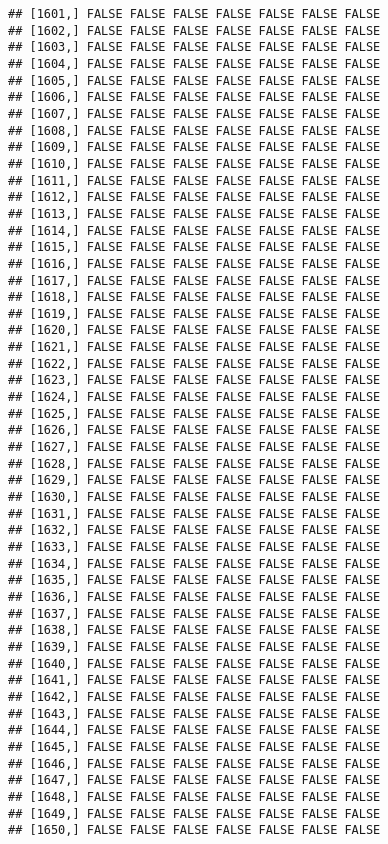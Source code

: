 \documentclass[
]{article}
\begin{document}
\begin{verbatim}
## [1601,] FALSE FALSE FALSE FALSE FALSE FALSE FALSE
## [1602,] FALSE FALSE FALSE FALSE FALSE FALSE FALSE
## [1603,] FALSE FALSE FALSE FALSE FALSE FALSE FALSE
## [1604,] FALSE FALSE FALSE FALSE FALSE FALSE FALSE
## [1605,] FALSE FALSE FALSE FALSE FALSE FALSE FALSE
## [1606,] FALSE FALSE FALSE FALSE FALSE FALSE FALSE
## [1607,] FALSE FALSE FALSE FALSE FALSE FALSE FALSE
## [1608,] FALSE FALSE FALSE FALSE FALSE FALSE FALSE
## [1609,] FALSE FALSE FALSE FALSE FALSE FALSE FALSE
## [1610,] FALSE FALSE FALSE FALSE FALSE FALSE FALSE
## [1611,] FALSE FALSE FALSE FALSE FALSE FALSE FALSE
## [1612,] FALSE FALSE FALSE FALSE FALSE FALSE FALSE
## [1613,] FALSE FALSE FALSE FALSE FALSE FALSE FALSE
## [1614,] FALSE FALSE FALSE FALSE FALSE FALSE FALSE
## [1615,] FALSE FALSE FALSE FALSE FALSE FALSE FALSE
## [1616,] FALSE FALSE FALSE FALSE FALSE FALSE FALSE
## [1617,] FALSE FALSE FALSE FALSE FALSE FALSE FALSE
## [1618,] FALSE FALSE FALSE FALSE FALSE FALSE FALSE
## [1619,] FALSE FALSE FALSE FALSE FALSE FALSE FALSE
## [1620,] FALSE FALSE FALSE FALSE FALSE FALSE FALSE
## [1621,] FALSE FALSE FALSE FALSE FALSE FALSE FALSE
## [1622,] FALSE FALSE FALSE FALSE FALSE FALSE FALSE
## [1623,] FALSE FALSE FALSE FALSE FALSE FALSE FALSE
## [1624,] FALSE FALSE FALSE FALSE FALSE FALSE FALSE
## [1625,] FALSE FALSE FALSE FALSE FALSE FALSE FALSE
## [1626,] FALSE FALSE FALSE FALSE FALSE FALSE FALSE
## [1627,] FALSE FALSE FALSE FALSE FALSE FALSE FALSE
## [1628,] FALSE FALSE FALSE FALSE FALSE FALSE FALSE
## [1629,] FALSE FALSE FALSE FALSE FALSE FALSE FALSE
## [1630,] FALSE FALSE FALSE FALSE FALSE FALSE FALSE
## [1631,] FALSE FALSE FALSE FALSE FALSE FALSE FALSE
## [1632,] FALSE FALSE FALSE FALSE FALSE FALSE FALSE
## [1633,] FALSE FALSE FALSE FALSE FALSE FALSE FALSE
## [1634,] FALSE FALSE FALSE FALSE FALSE FALSE FALSE
## [1635,] FALSE FALSE FALSE FALSE FALSE FALSE FALSE
## [1636,] FALSE FALSE FALSE FALSE FALSE FALSE FALSE
## [1637,] FALSE FALSE FALSE FALSE FALSE FALSE FALSE
## [1638,] FALSE FALSE FALSE FALSE FALSE FALSE FALSE
## [1639,] FALSE FALSE FALSE FALSE FALSE FALSE FALSE
## [1640,] FALSE FALSE FALSE FALSE FALSE FALSE FALSE
## [1641,] FALSE FALSE FALSE FALSE FALSE FALSE FALSE
## [1642,] FALSE FALSE FALSE FALSE FALSE FALSE FALSE
## [1643,] FALSE FALSE FALSE FALSE FALSE FALSE FALSE
## [1644,] FALSE FALSE FALSE FALSE FALSE FALSE FALSE
## [1645,] FALSE FALSE FALSE FALSE FALSE FALSE FALSE
## [1646,] FALSE FALSE FALSE FALSE FALSE FALSE FALSE
## [1647,] FALSE FALSE FALSE FALSE FALSE FALSE FALSE
## [1648,] FALSE FALSE FALSE FALSE FALSE FALSE FALSE
## [1649,] FALSE FALSE FALSE FALSE FALSE FALSE FALSE
## [1650,] FALSE FALSE FALSE FALSE FALSE FALSE FALSE

\end{verbatim}
\end{document}
